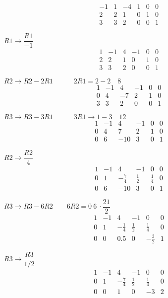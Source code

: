 \documentclass[a4paper,11pt]{article}
\begin{document}
\[\begin{array}{rrr|rrr} -1 & 1 & -4 & 1 & 0 & 0 \\ 2 & 2 & 1 & 0 & 1 & 0 \\ 3 & 3 & 2 & 0 & 0 & 1\end{array}\]


\( R1 \rightarrow \dfrac{R1}{-1} \)
\[\begin{array}{rrr|rrr} 1 & -1 & 4 & -1 & 0 & 0 \\ 2 & 2 & 1 & 0 & 1 & 0 \\ 3 & 3 & 2 & 0 & 0 & 1  \end{array}\]

\( R2 \rightarrow R2 - 2 R1 \quad\quad\quad 2R1 = 2 - 2 \quad 8 \)
\[\begin{array}{rrr|rrr} 1 & -1 & 4 & -1 & 0 & 0 \\ 0 & 4 & -7 & 2 & 1 & 0 \\ 3 & 3 & 2 & 0 & 0 & 1 \end{array}\]

\( R3 \rightarrow R3 - 3R1 \quad\quad\quad 3R1 \rightarrow 1 - 3 \quad 12 \)
\[\begin{array}{rrr|rrr} 1 & -1 & 4 & -1 & 0 & 0 \\ 0 & 4 & 7 & 2 & 1 & 0 \\ 0 & 6 &- 10 & 3 & 0 & 1  \end{array}\]

\( R2 \rightarrow \dfrac{R2}{4}  \)
\[\begin{array}{rrr|rrr} 1 & -1 & 4 & -1 & 0 & 0 \\ 0 & 1 & -\frac{7}{4} & \frac{1}{2} & \frac{1}{4} & 0 \\ 0 & 6 & -10 & 3 & 0 & 1  \end{array}\]

\( R3 \rightarrow R3 - 6R2 \quad\quad 6R2 = 0 \: 6 \: \cdot \dfrac{21}{2} \)
\[\begin{array}{rrr|rrr} 1 & -1 & 4 & -1 & 0 & 0 \\ 0 & 1 & -\frac{1}{4} & \frac{1}{2} & \frac{1}{4} & 0 \\ 0 & 0 & 0.5 & 0 & -\frac{3}{2} & 1  \end{array}\]

\( R3 \rightarrow \dfrac{R3}{1/2} \)
\[\begin{array}{rrr|rrr} 1 & -1 & 4 & -1 & 0 & 0 \\ 0 & 1 & -\frac{7}{4} & \frac{1}{2} & \frac{1}{4} & 0 \\ 0 & 0 & 1 & 0 & -3 & 2  \end{array}\]
\end{document}
